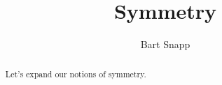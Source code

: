 \documentclass[handout,nooutcomes,noauthor]{ximera}
\title{Symmetry}
\author{Bart Snapp}
\begin{document}
\begin{abstract}
  Let's expand our notions of symmetry.
\end{abstract}
\maketitle


\begin{listOutcomes}
\item 
\end{listOutcomes}
\end{document}
